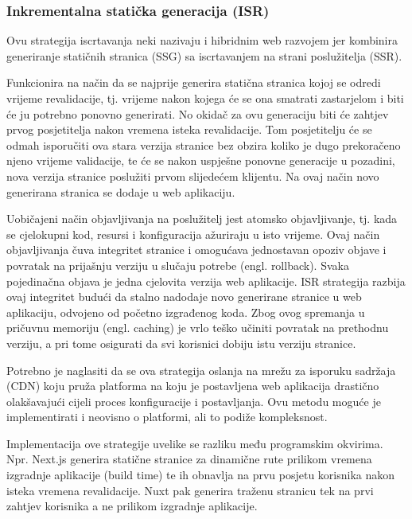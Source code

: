 \subsubsection{Inkrementalna statička generacija (ISR)}

Ovu strategija iscrtavanja neki nazivaju i hibridnim web razvojem jer kombinira generiranje statičnih stranica (SSG) sa iscrtavanjem na strani poslužitelja (SSR).

\bigskip

Funkcionira na način da se najprije generira statična stranica kojoj se odredi vrijeme revalidacije, tj. vrijeme nakon kojega će se ona smatrati zastarjelom i biti će ju potrebno ponovno  generirati. No okidač za ovu generaciju biti će zahtjev prvog posjetitelja nakon vremena isteka revalidacije. Tom posjetitelju će se odmah isporučiti ova stara verzija stranice bez obzira koliko je dugo prekoračeno njeno vrijeme validacije, te će se nakon uspješne ponovne generacije u pozadini, nova verzija stranice poslužiti prvom slijedećem klijentu. Na ovaj način novo generirana stranica se dodaje u web aplikaciju.

\bigskip

Uobičajeni način objavljivanja na poslužitelj jest atomsko objavljivanje, tj. kada se cjelokupni kod, resursi i konfiguracija ažuriraju u isto vrijeme. Ovaj način objavljivanja čuva integritet stranice i omogućava jednostavan opoziv objave i povratak na prijašnju verziju u slučaju potrebe (engl. rollback). Svaka pojedinačna objava je jedna cjelovita verzija web aplikacije. ISR strategija razbija ovaj integritet budući da stalno nadodaje novo generirane stranice u web aplikaciju, odvojeno od početno izgrađenog koda. Zbog ovog spremanja u pričuvnu memoriju (engl. caching)  je vrlo teško učiniti povratak na prethodnu verziju, a pri tome osigurati da svi korisnici dobiju istu verziju stranice. \cite{flaws2021isr}

\bigskip

Potrebno je naglasiti da se ova strategija oslanja na mrežu za isporuku sadržaja (CDN) koju pruža platforma na koju je postavljena web aplikacija drastično olakšavajući cijeli proces konfiguracije i postavljanja. Ovu metodu moguće je implementirati i neovisno o platformi, ali to podiže kompleksnost.

\bigskip

Implementacija ove strategije uvelike se razliku među programskim okvirima.
Npr. Next.js generira statične stranice za dinamične rute prilikom vremena izgradnje aplikacije (build time) te ih obnavlja na prvu posjetu korisnika nakon isteka vremena revalidacije. Nuxt pak generira traženu stranicu tek na prvi zahtjev korisnika a ne prilikom izgradnje aplikacije. \cite{troyan2024nuxt}

